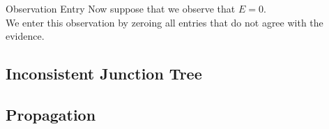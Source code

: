 \documentclass[10pt,usenames,dvipsnames]{beamer}
\begin{document}
\begin{frame}{Observation Entry}
  \centering
  {\footnotesize
    Now suppose that we observe that $E=0$.\\
    We enter this observation by zeroing all entries that do not agree with the
    evidence.  
  }
  \begin{table}
  \end{table}
\end{frame}

\subsection{Inconsistent Junction Tree}

\subsection{Propagation}
\end{document}
